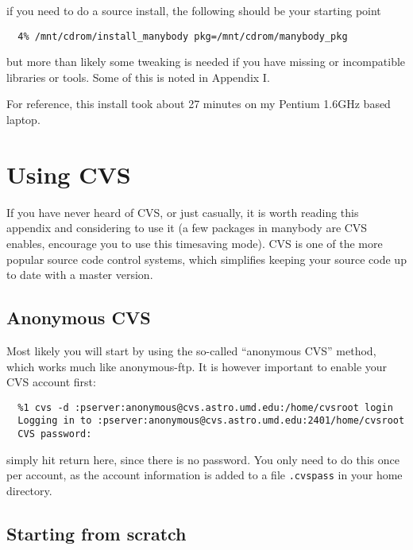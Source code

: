 if you need to do a source install, the following should be your starting point

\footnotesize\begin{verbatim}
  4% /mnt/cdrom/install_manybody pkg=/mnt/cdrom/manybody_pkg
\end{verbatim}\normalsize

but more than likely some tweaking is needed if you have missing or
incompatible libraries or tools. Some of this is noted in Appendix I.

For reference, this install took about 27 minutes on my Pentium 1.6GHz based
laptop.

\chapter                {Using CVS}

If you have never heard of CVS, or just casually, 
it is worth reading
this appendix and considering to use it (a few packages
in manybody are CVS enables, encourage you to use this timesaving mode).
CVS is one of the more popular
source code control systems, which simplifies keeping your source code
up to date with a master version. 

\section{Anonymous CVS}

Most likely you will start by using the so-called ``anonymous CVS''
method, which works much like anonymous-ftp.  It is  however
important to enable your CVS account first:

\footnotesize\begin{verbatim}
  %1 cvs -d :pserver:anonymous@cvs.astro.umd.edu:/home/cvsroot login
  Logging in to :pserver:anonymous@cvs.astro.umd.edu:2401/home/cvsroot
  CVS password: 
\end{verbatim}\normalsize

simply hit return here, since there is no password. You only need to do
this once per account, as the account information is added to a file
{\tt .cvspass} in your home directory.


\section{Starting from scratch}

